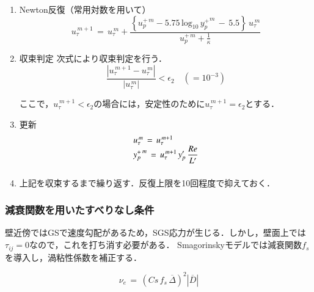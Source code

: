 \begin{enumerate}
\item Newton反復（常用対数を用いて）
\begin{equation} 
u_{\tau}^{\,m+1} \,=\, u_{\tau}^{\,m} + 
\frac{ \displaystyle{
\left\{ u_p^{+\,m} -  5.75 \, \mathrm{log_{10}}\,{y_p^+}^m \,-\, 5.5 \right\} \, u_{\tau}^{\,m} }
}{ \displaystyle{
u_p^{+\,m} + \frac{1}{\kappa} }
}
\label{eq:newton iteration wall func ND2}
\end{equation}

\vspace{2mm}
\item 収束判定
次式により収束判定を行う．
\begin{equation} 
\displaystyle{ \frac{|u_{\tau}^{\,m+1}-u_{\tau}^{\,m}|}{|u_{\tau}^{\,m}|} < \epsilon_2 \quad(=10^{-3}) }
\label{eq:newton iteration criteria}
\end{equation}

ここで，$u_{\tau}^{\,m+1}<\epsilon_2$の場合には，安定性のために$u_{\tau}^{\,m+1}=\epsilon_2$とする．
\vspace{2mm}

\item 更新\\
\begin{equation}
\begin{array}{l}
u_{\tau}^{\,m} \,=\, u_{\tau}^{\,m+1}\\
\vspace{2mm}
\displaystyle{ {y_p^+}^{\,m} \,=\, u_{\tau}^{\,m+1} \, y_p^{\prime} \, \frac{Re}{L^{\prime}} }\\
\end{array}
\label{eq:newton iteration wall func ND2}
\end{equation}
\vspace{2mm}

\item 上記を収束するまで繰り返す．反復上限を10回程度で抑えておく．
\end{enumerate}


%
\subsubsection{減衰関数を用いたすべりなし条件}

壁近傍ではGSで速度勾配があるため，SGS応力が生じる．しかし，壁面上では$\tau_{ij}=0$なので，これを打ち消す必要がある．
Smagorinskyモデルでは減衰関数$f_s$を導入し，渦粘性係数を補正する．

\begin{equation}
\nu_e \,=\, \left( Cs \,f_s \, \overline{\Delta} \right)^2 \left| \overline{D} \right|
\label{eq:nu-SGS modified}
\end{equation}

